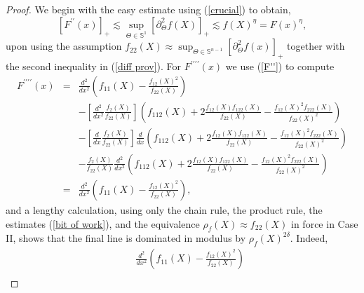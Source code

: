 \documentclass{amsart}
\theoremstyle{plain}
\numberwithin{equation}{section}
\begin{document}
\begin{proof}
We begin with the easy estimate using (\ref{crucial}) to obtain,%
\begin{equation*}
\left[ F^{\prime \prime }\left( x\right) \right] _{+}\lesssim\sup_{\Theta \in 
\mathbb{S}^{1}}\left[ \partial _{\Theta }^{2}f\left( X\right) \right]
_{+}\lesssim f\left( X\right) ^{\eta }=F\left( x\right) ^{\eta },
\end{equation*}%
upon using the assumption $f_{22}\left( X\right) \approx \sup_{\Theta \in 
\mathbb{S}^{n-1}}\left[ \partial _{\Theta }^{2}f\left( x\right) \right] _{+}$
together with the second inequality in (\ref{diff prov}). For $F^{\prime
\prime \prime \prime }\left( x\right) $ we use (\ref{F''}) to compute 
\begin{eqnarray*}
F^{\prime \prime \prime \prime }\left( x\right)  &=&\frac{d^{2}}{dx^{2}}%
\left( f_{11}\left( X\right) -\frac{f_{12}\left( X\right) ^{2}}{f_{22}\left(
X\right) }\right)  \\
&&-\left[ \frac{d^{2}}{dx^{2}}\frac{f_{2}\left( X\right) }{f_{22}\left(
X\right) }\right] \left( f_{112}\left( X\right) +2\frac{f_{12}\left(
X\right) f_{122}\left( X\right) }{f_{22}\left( X\right) }-\frac{f_{12}\left(
X\right) ^{2}f_{222}\left( X\right) }{f_{22}\left( X\right) ^{2}}\right)  \\
&&-\left[ \frac{d}{dx}\frac{f_{2}\left( X\right) }{f_{22}\left( X\right) }%
\right] \frac{d}{dx}\left( f_{112}\left( X\right) +2\frac{f_{12}\left(
X\right) f_{122}\left( X\right) }{f_{22}\left( X\right) }-\frac{f_{12}\left(
X\right) ^{2}f_{222}\left( X\right) }{f_{22}\left( X\right) ^{2}}\right)  \\
&&-\frac{f_{2}\left( X\right) }{f_{22}\left( X\right) }\frac{d^{2}}{dx^{2}}%
\left( f_{112}\left( X\right) +2\frac{f_{12}\left( X\right) f_{122}\left(
X\right) }{f_{22}\left( X\right) }-\frac{f_{12}\left( X\right)
^{2}f_{222}\left( X\right) }{f_{22}\left( X\right) ^{2}}\right)  \\
&=&\frac{d^{2}}{dx^{2}}\left( f_{11}\left( X\right) -\frac{f_{12}\left(
X\right) ^{2}}{f_{22}\left( X\right) }\right) ,
\end{eqnarray*}%
and a lengthy calculation, using only the chain rule, the product rule, the
estimates (\ref{bit of work}), and the equivalence $\rho _{f}\left( X\right)
\approx f_{22}\left( X\right) $ in force in Case II, shows that the final
line is dominated in modulus by $\rho _{f}\left( X\right) ^{2\delta }$.
Indeed,%
\begin{eqnarray*}
&&\frac{d^{2}}{dx^{2}}\left( f_{11}\left( X\right) -\frac{f_{12}\left(
X\right) ^{2}}{f_{22}\left( X\right) }\right)  \\

\end{eqnarray*}
\end{proof}
\end{document}
